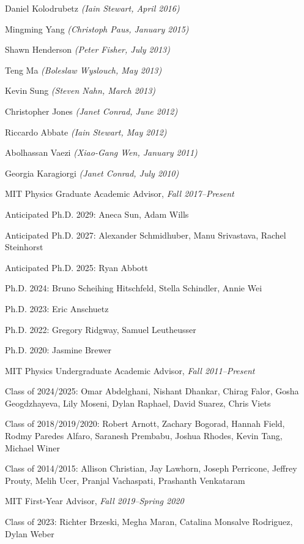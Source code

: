 \item Daniel Kolodrubetz \textit{(Iain Stewart, April 2016)}
\item Mingming Yang \textit{(Christoph Paus, January 2015)}
\item Shawn Henderson \textit{(Peter Fisher, July 2013)}
\item Teng Ma \textit{(Boleslaw Wyslouch, May 2013)}
\item Kevin Sung \textit{(Steven Nahn, March 2013)}
\item Christopher Jones \textit{(Janet Conrad, June 2012)}
\item Riccardo Abbate \textit{(Iain Stewart, May 2012)}
\item Abolhassan Vaezi \textit{(Xiao-Gang Wen, January 2011)}
\item Georgia Karagiorgi \textit{(Janet Conrad, July 2010)}
\el 
\item MIT Physics Graduate Academic Advisor, \emph{Fall 2017--Present}
\bsbl 
\item Anticipated Ph.D. 2029: Aneca Sun, Adam Wills
\item Anticipated Ph.D. 2027: Alexander Schmidhuber, Manu Srivastava, Rachel Steinhorst
\item Anticipated Ph.D. 2025: Ryan Abbott
\item Ph.D. 2024: Bruno Scheihing Hitschfeld, Stella Schindler, Annie Wei
\item Ph.D. 2023: Eric Anschuetz
\item Ph.D. 2022: Gregory Ridgway, Samuel Leutheusser
\item Ph.D. 2020: Jasmine Brewer
\el 
\item MIT Physics Undergraduate Academic Advisor, \emph{Fall 2011--Present}
\bsbl 
\item Class of 2024/2025: Omar Abdelghani, Nishant Dhankar, Chirag Falor, Gosha Geogdzhayeva, Lily Moseni, Dylan Raphael, David Suarez, Chris Viets
\item Class of 2018/2019/2020: Robert Arnott, Zachary Bogorad, Hannah Field, Rodmy Paredes Alfaro, Saranesh Prembabu, Joshua Rhodes, Kevin Tang, Michael Winer
\item Class of 2014/2015: Allison Christian, Jay Lawhorn, Joseph Perricone, Jeffrey Prouty, Melih Ucer, Pranjal Vachaspati, Prashanth Venkataram
\el 
\item MIT First-Year Advisor, \emph{Fall 2019--Spring 2020}
\bsbl 
\item Class of 2023: Richter Brzeski, Megha Maran, Catalina Monsalve Rodriguez, Dylan Weber
\el 

